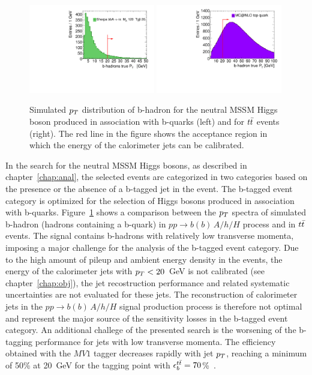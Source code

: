 \begin{figure}[tp]
     \begin{center}

            \includegraphics[width=0.49\textwidth]{figure/trackjet/b_pt_distro2.pdf}
            \includegraphics[width=0.49\textwidth]{figure/trackjet/top_pt_distro.pdf}

    \end{center}
    \caption{Simulated $p_{T}$ distribution of b-hadron for the neutral MSSM Higgs boson produced in association with b-quarks (left) 
	and for $t\bar{t}$ events (right). The red line in the figure shows the acceptance region in which the energy of the calorimeter
	jets can be calibrated.}
   \label{fig:bjetDistro}
\end{figure}


In the search for the neutral MSSM Higgs bosons, as described in chapter~\ref{chap:anal}, the selected events are categorized 
in two categories based on the presence or the absence of a b-tagged jet in the event. The b-tagged event category 
is optimized for the selection of Higgs bosons produced in association with b-quarks. Figure~\ref{fig:bjetDistro} shows a comparison 
between the $p_{T}$ spectra of simulated b-hadron (hadrons containing a b-quark) in $pp\rightarrow b(b)\,A/h/H$ process  and in $t\bar{t}$ events.
The signal contains  b-hadrons with relatively low transverse momenta, imposing a  major challenge 
for the analysis of the b-tagged event category. Due to the high amount of pileup and ambient energy density in the events, 
the energy of the calorimeter jets with $p_{T}<20$~GeV is not calibrated (see chapter~\ref{chap:obj}), the jet recostruction performance 
and related systematic uncertainties are not evaluated for these jets. The reconstruction of calorimeter jets in the $pp\rightarrow b(b)\,A/h/H$ 
signal production process is therefore not optimal and represent the major source of the sensitivity losses 
in the b-tagged event category.
An additional challege of the presented search is the worsening of the  b-tagging performance for jets with low transverse momenta. 
The efficiency obtained with the $MV1$ tagger decreases  rapidly  with jet $p_{T}$, reaching a minimum of 50\% at 
20~GeV for the tagging point with $\epsilon_b^{t\bar{t}}=70$\%~\cite{BtaggingScaleFactors,BtaggingScaleFactorsNew}.

